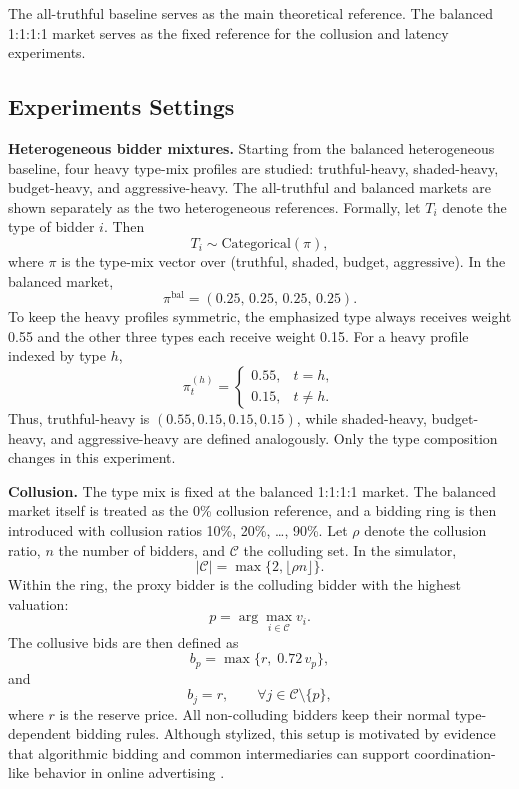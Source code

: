 \documentclass[12pt,a4paper]{article}
\begin{document}
The all-truthful baseline serves as the main theoretical reference. The balanced 1:1:1:1 market serves as the fixed reference for the collusion and latency experiments.

\subsection{Experiments Settings}

\textbf{Heterogeneous bidder mixtures.} Starting from the balanced heterogeneous baseline, four heavy type-mix profiles are studied: truthful-heavy, shaded-heavy, budget-heavy, and aggressive-heavy. The all-truthful and balanced markets are shown separately as the two heterogeneous references. Formally, let $T_i$ denote the type of bidder $i$. Then
\[
T_i \sim \mathrm{Categorical}(\pi),
\]
where $\pi$ is the type-mix vector over (truthful, shaded, budget, aggressive). In the balanced market,
\[
\pi^{\text{bal}} = (0.25,\, 0.25,\, 0.25,\, 0.25).
\]
To keep the heavy profiles symmetric, the emphasized type always receives weight 0.55 and the other three types each receive weight 0.15. For a heavy profile indexed by type $h$,
\[
\pi_t^{(h)} =
\begin{cases}
0.55, & t = h,\\[4pt]
0.15, & t \neq h.
\end{cases}
\]
Thus, truthful-heavy is $(0.55, 0.15, 0.15, 0.15)$, while shaded-heavy, budget-heavy, and aggressive-heavy are defined analogously. Only the type composition changes in this experiment.

\textbf{Collusion.} The type mix is fixed at the balanced 1:1:1:1 market. The balanced market itself is treated as the 0\% collusion reference, and a bidding ring is then introduced with collusion ratios 10\%, 20\%, \dots, 90\%. Let $\rho$ denote the collusion ratio, $n$ the number of bidders, and $\mathcal{C}$ the colluding set. In the simulator,
\[
|\mathcal{C}| = \max\{2,\lfloor \rho n \rfloor\}.
\]
Within the ring, the proxy bidder is the colluding bidder with the highest valuation:
\[
p = \arg\max_{i \in \mathcal{C}} v_i.
\]
The collusive bids are then defined as
\[
b_p = \max\{r,\; 0.72\, v_p\},
\]
and
\[
b_j = r, \qquad \forall j \in \mathcal{C}\setminus\{p\},
\]
where $r$ is the reserve price. All non-colluding bidders keep their normal type-dependent bidding rules. Although stylized, this setup is motivated by evidence that algorithmic bidding and common intermediaries can support coordination-like behavior in online advertising \cite{decarolis2024}.
\end{document}
